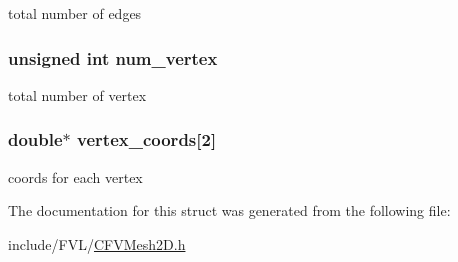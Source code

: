 total number of edges 

\hypertarget{structFVL_1_1CFVMesh2D__cuda_a66b841fd6e58a9fc9b63df4fe982178f}{
\subsubsection[{num\_\-vertex}]{\setlength{\rightskip}{0pt plus 5cm}unsigned int {\bf num\_\-vertex}}}
\label{dd/d46/structFVL_1_1CFVMesh2D__cuda_a66b841fd6e58a9fc9b63df4fe982178f}


total number of vertex 

\hypertarget{structFVL_1_1CFVMesh2D__cuda_a03658bd1b0082d5bd0726d7ef81c0bc2}{
\subsubsection[{vertex\_\-coords}]{\setlength{\rightskip}{0pt plus 5cm}double$\ast$ {\bf vertex\_\-coords}\mbox{[}2\mbox{]}}}
\label{dd/d46/structFVL_1_1CFVMesh2D__cuda_a03658bd1b0082d5bd0726d7ef81c0bc2}


coords for each vertex 



The documentation for this struct was generated from the following file:\begin{DoxyCompactItemize}
\item 
include/FVL/\hyperlink{CFVMesh2D_8h}{CFVMesh2D.h}\end{DoxyCompactItemize}
